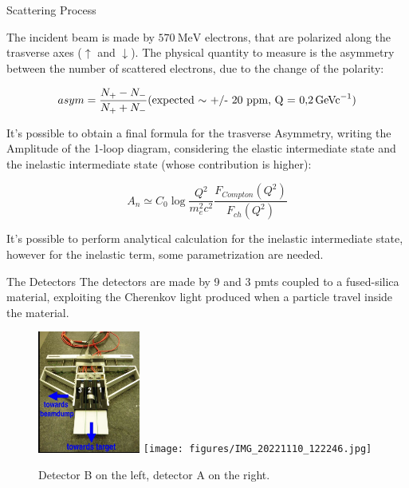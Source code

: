 \documentclass[8pt,a4paper]{beamer}
\begin{document}
\begin{frame}{Scattering Process}

The incident beam is made by $\SI{570}{\mega \electronvolt}$ electrons, that are polarized along the trasverse axes ($\uparrow$ and $\downarrow$). The physical quantity to measure is the asymmetry between the number of scattered electrons, due to the change of the polarity:

\begin{equation}
asym = \frac{N_{+} - N_{-}}{N_{+} + N_{-}} \text{(expected $\sim$ +/- 20 ppm, Q = \SI{0.2}{\giga\electronvolt c^{-1}})}
\end{equation}

It's possible to obtain a final formula for the trasverse Asymmetry, writing the Amplitude of the 1-loop diagram, considering the elastic intermediate state and the inelastic intermediate state (whose contribution is higher):

\begin{equation}
A_{n} \simeq C_{0} \log \frac{Q^{2}}{m^2_e c^2} \frac{F_{Compton} (Q^2)}{F_{ch}(Q^2)}
\end{equation}

It's possible to perform analytical calculation for the inelastic intermediate state, however for the inelastic term, some parametrization are needed.

\end{frame}

\begin{frame}{The Detectors}
The detectors are made by 9 and 3 pmts coupled to a fused-silica material, exploiting the Cherenkov light produced when a particle travel inside the material.

\begin{figure}[hbtp]
\centering
\includegraphics[width = 0.3\textwidth]{figures/504px-Blackfalcon.jpg}
\hspace{2cm}
\texttt{[image: figures/IMG\_20221110\_122246.jpg]}
\caption{Detector B on the left, detector A on the right.}
\end{figure}

\end{frame}
\end{document}
